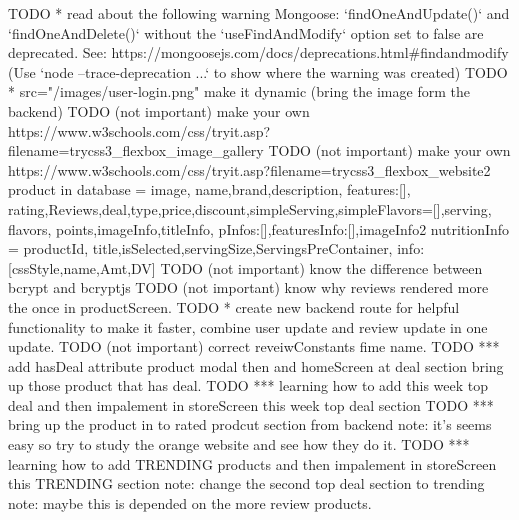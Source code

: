 {TODO * read about the following warning 
       Mongoose: `findOneAndUpdate()` and `findOneAndDelete()` without the `useFindAndModify` option set to false are deprecated. See: https://mongoosejs.com/docs/deprecations.html#findandmodify
      (Use `node --trace-deprecation ...` to show where the warning was created)
TODO *   src="/images/user-login.png" make it dynamic (bring the image form the backend)
TODO (not important) make your own https://www.w3schools.com/css/tryit.asp?filename=trycss3_flexbox_image_gallery
TODO (not important) make your own https://www.w3schools.com/css/tryit.asp?filename=trycss3_flexbox_website2
product in database = {image, name,brand,description, features:[], rating,Reviews,deal,type,price,discount,simpleServing,simpleFlavors=[],serving, flavors, points,imageInfo,titleInfo, pInfos:[],featuresInfo:[],imageInfo2}
nutritionInfo = {productId, title,isSelected,servingSize,ServingsPreContainer, info:[{cssStyle,name,Amt,DV}] }
TODO  (not important) know the difference between bcrypt and bcryptjs
TODO  (not important) know why reviews rendered more the once in productScreen.
TODO * create new backend route for helpful functionality to make it faster, combine user update and review update in one update.
TODO  (not important) correct reveiwConstants fime name.
TODO *** add hasDeal attribute product modal then and homeScreen at deal section bring up those product that has deal.
TODO *** learning how to add this week top deal and then impalement in storeScreen this week top deal section
TODO *** bring up the product in to rated prodcut section from backend 
      note: it's seems easy so try to study the orange website and see how they do it.
TODO *** learning how to add TRENDING products and then impalement in storeScreen this TRENDING section
      note: change the second top deal section to trending 
      note: maybe this is depended on the more review products.
      
}
